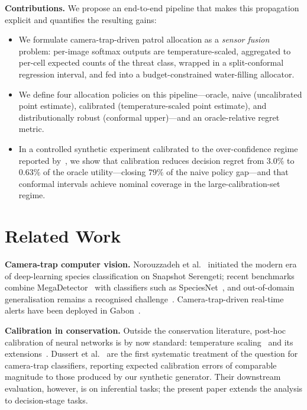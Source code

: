 \documentclass[conference]{IEEEtran}
\begin{document}
\noindent\textbf{Contributions.} We propose an end-to-end pipeline that
makes this propagation explicit and quantifies the resulting gains:
\begin{itemize}
  \item We formulate camera-trap-driven patrol allocation as a
    \emph{sensor fusion} problem: per-image softmax outputs are
    temperature-scaled, aggregated to per-cell expected counts of the
    threat class, wrapped in a split-conformal regression interval, and
    fed into a budget-constrained water-filling allocator.
  \item We define four allocation policies on this pipeline---oracle,
    naive (uncalibrated point estimate), calibrated (temperature-scaled
    point estimate), and distributionally robust (conformal
    upper)---and an oracle-relative regret metric.
  \item In a controlled synthetic experiment calibrated to the
    over-confidence regime reported by~\cite{dussert2025confident}, we
    show that calibration reduces decision regret from $3.0\%$ to
    $0.63\%$ of the oracle utility---closing $79\%$ of the naive policy
    gap---and that conformal intervals achieve nominal coverage in the
    large-calibration-set regime.
\end{itemize}

\section{Related Work}

\textbf{Camera-trap computer vision.} Norouzzadeh et
al.~\cite{norouzzadeh2018automatically} initiated the modern era of
deep-learning species classification on Snapshot Serengeti; recent
benchmarks combine MegaDetector~\cite{morris2025megadetector} with
classifiers such as SpeciesNet~\cite{gadot2024crop}, and out-of-domain
generalisation remains a recognised challenge~\cite{norman2023cnn,
beery2018recognition,pahuja2024cosmo}. Camera-trap-driven real-time
alerts have been deployed in
Gabon~\cite{whytock2023real}.

\textbf{Calibration in conservation.} Outside the conservation
literature, post-hoc calibration of neural networks is by now standard:
temperature scaling~\cite{guo2017calibration} and its
extensions~\cite{platt1999probabilistic}. Dussert et
al.~\cite{dussert2025confident} are the first systematic treatment of
the question for camera-trap classifiers, reporting expected
calibration errors of comparable magnitude to those produced by our
synthetic generator. Their downstream evaluation, however, is on
inferential tasks; the present paper extends the analysis to
decision-stage tasks.
\end{document}
